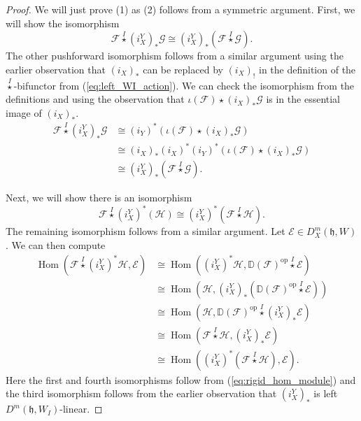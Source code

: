 \documentclass[10pt,a4paper]{amsart}
\newcommand{\BE}{D^m}
\newcommand{\DD}{\mathbb{D}}
\DeclareMathOperator{\Hom}{Hom}
\newcommand{\fr}[1]{\mathfrak{#1}}
\DeclareMathOperator{\op}{op}
\newcommand{\scrE}{\mathcal{E}}
\newcommand{\scrF}{\mathcal{F}}
\newcommand{\scrG}{\mathcal{G}}
\newcommand{\scrH}{\mathcal{H}}
\newcommand{\wistar}{\stackrel{I}{\star}}
\begin{document}
        \begin{proof}
                We will just prove (1) as (2) follows from a symmetric argument.
                First, we will show the isomorphism
                \[ \scrF \wistar (i_X^Y)_* \scrG \cong (i_X^Y)_* (\scrF \wistar \scrG).\]
                The other pushforward isomorphism follows from a similar argument using the earlier observation that $(i_X)_*$ can be replaced by $(i_X)_!$ in the definition of the $\wistar$-bifunctor from (\ref{eq:left_WI_action}).
                We can check the isomorphism from the definitions and using the observation that $\iota (\mathcal{F}) \star (i_X)_* \mathcal{G}$ is in the essential image of $(i_X)_*$.
                \begin{align*}
                        \mathcal{F} \wistar (i_X^Y)_* \scrG &\cong (i_Y)^* (\iota (\scrF) \star (i_X)_* \scrG) \\
                        &\cong (i_X)_* (i_X)^* (i_Y)^*  (\iota (\scrF) \star (i_X)_* \scrG) \\
                        &\cong (i_X^Y)_* (\scrF \wistar \scrG).
                \end{align*}
                
                Next, we will show there is an isomorphism
                \[ \scrF \wistar (i_X^Y)^* (\scrH) \cong (i_X^Y)^* (\scrF \wistar \scrH).\]
                The remaining isomorphism follows from a similar argument.
                Let $\scrE \in \BE_X (\fr{h}, W)$. We can then compute
                \begin{align*}
                        \Hom (\scrF \wistar (i_X^Y)^* \scrH, \scrE) &\cong \Hom ((i_X^Y)^* \scrH, \DD (\scrF)^{\op} \wistar \scrE) \\
                        &\cong \Hom ( \scrH, (i_X^Y)_* ( \DD (\scrF)^{\op}  \wistar \scrE )) \\
                        &\cong \Hom (\scrH,  \DD (\scrF)^{\op} \wistar (i_X^Y)_* \scrE) \\
                        &\cong \Hom (\scrF \wistar \scrH,  (i_X^Y)_* \scrE) \\
                        &\cong \Hom ((i_X^Y)^* (\scrF \wistar \scrH), \scrE).
                \end{align*}
                Here the first and fourth isomorphisms follow from (\ref{eq:rigid_hom_module}) and the third isomorphism follows from the earlier observation that $(i_X^Y)_*$ is left $\BE (\fr{h}, W_I)$-linear.
        \end{proof}
\end{document}

